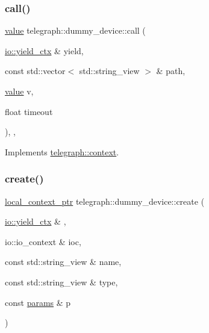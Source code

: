 \subsubsection{\texorpdfstring{call()}{call()}\hspace{0.1cm}{\footnotesize\ttfamily [2/2]}}
{\footnotesize\ttfamily \hyperlink{classtelegraph_1_1value}{value} telegraph\+::dummy\+\_\+device\+::call (\begin{DoxyParamCaption}\item[{\hyperlink{structboost_1_1asio_1_1yield__ctx}{io\+::yield\+\_\+ctx} \&}]{yield,  }\item[{const std\+::vector$<$ std\+::string\+\_\+view $>$ \&}]{path,  }\item[{\hyperlink{classtelegraph_1_1value}{value}}]{v,  }\item[{float}]{timeout }\end{DoxyParamCaption})\hspace{0.3cm}{\ttfamily [inline]}, {\ttfamily [override]}, {\ttfamily [virtual]}}



Implements \hyperlink{classtelegraph_1_1context_a0798d49ea0874a870d4c980f6f09b6c2}{telegraph\+::context}.

\mbox{\label{classtelegraph_1_1dummy__device_a185602ee7a397af9cf23a5bb1bab50d3}} 
\subsubsection{\texorpdfstring{create()}{create()}}
{\footnotesize\ttfamily \hyperlink{namespacetelegraph_ab59c7b38d99a98b4acc22433c920b1e6}{local\+\_\+context\+\_\+ptr} telegraph\+::dummy\+\_\+device\+::create (\begin{DoxyParamCaption}\item[{\hyperlink{structboost_1_1asio_1_1yield__ctx}{io\+::yield\+\_\+ctx} \&}]{,  }\item[{io\+::io\+\_\+context \&}]{ioc,  }\item[{const std\+::string\+\_\+view \&}]{name,  }\item[{const std\+::string\+\_\+view \&}]{type,  }\item[{const \hyperlink{classtelegraph_1_1params}{params} \&}]{p }\end{DoxyParamCaption})\hspace{0.3cm}{\ttfamily [static]}}

